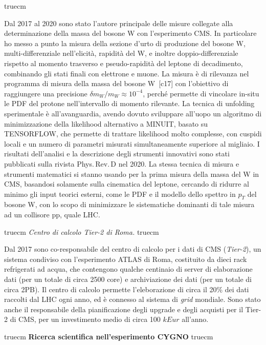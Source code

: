 \documentclass[11pt,twoside,a4paper]{article}
\begin{document}
 truecm

Dal 2017 al 2020 sono stato l'autore principale delle misure collegate
alla determinazione della massa del bosone W con l'esperimento CMS. In
particolare ho messo a punto la misura della sezione d'urto di
produzione del bosone W, multi-differenziale nell'elicit\`a,
rapidit\`a del W, e inoltre doppio-differenziale rispetto al momento
trasverso e pseudo-rapidit\`a del leptone di decadimento, combinando
gli stati finali con elettrone e muone. La misura \`e di rilevanza nel
programma di misura della massa del bosone W~[c17] con l'obiettivo di
raggiungere una precisione $\delta m_W/m_W\approx 10^{-4}$, perch\'e
permette di vincolare in-situ le PDF del protone nell'intervallo di
momento rilevante. La tecnica di unfolding sperimentale \`e
all'avanguardia, avendo dovuto sviluppare all'uopo un algoritmo di
minimizzazione della likelihood alternativo a \textsc{MINUIT}, basato
su \textsc{TENSORFLOW}, che permette di trattare likelihood molto
complesse, con cuspidi locali e un numero di parametri misurati
simultaneamente superiore al migliaio. I risultati dell'analisi e la
descrizione degli strumenti innovativi sono stati pubblicati sulla
rivista Phys.\,Rev.\,D nel 2020. La stessa tecnica di misura e
strumenti matematici si stanno usando per la prima misura della massa
del W in CMS, basandosi solamente sulla cinematica del leptone,
cercando di ridurre al minimo gli input teorici esterni, come le PDF e
il modello dello spettro in $p_T$ del bosone W, con lo scopo di
minimizzare le sistematiche dominanti di tale misura ad un collisore
pp, quale LHC.

 truecm
\textit{Centro di calcolo Tier-2 di Roma.}
 truecm

Dal 2017 sono co-responsabile del centro di calcolo per i dati di CMS
(\textit{Tier-2}), un sistema condiviso con l'esperimento ATLAS di
Roma, costituito da dieci rack refrigerati ad acqua, che contengono
qualche centinaio di server di elaborazione dati (per un totale di
circa 2500 core) e archiviazione dei dati (per un totale di circa
2PB). Il centro di calcolo permette l'eleborazione di circa il 20\%
dei dati raccolti dal LHC ogni anno, ed \`e connesso al sistema di
\textit{grid} mondiale. Sono stato anche il responsabile della
pianificazione degli upgrade e degli acquisti per il Tier-2 di CMS,
per un investimento medio di circa 100 $kEur$ all'anno.


 truecm
{\bf{Ricerca scientifica nell'esperimento CYGNO}}
 truecm
\end{document}
